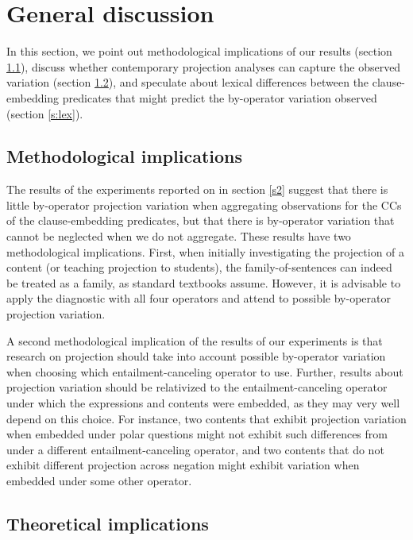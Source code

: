 \documentclass[a4paper,12pt,twoside]{article}
\begin{document}
\section{General discussion}\label{s:general}

    In this section, we point out methodological implications of our results (section \ref{s:method-impl}), discuss whether contemporary projection analyses can capture the observed variation (section \ref{s:analysis}), and speculate about lexical differences between the clause-embedding predicates that might predict the by-operator variation observed (section \ref{s:lex}).

\subsection{Methodological implications}\label{s:method-impl}

    The results of the experiments reported on in section \ref{s2} suggest that there is little by-operator projection variation when aggregating observations for the CCs of the  clause-embedding predicates, but that there is by-operator variation that cannot be neglected when we do not aggregate. These results have two methodological implications. First, when initially investigating the projection of a content (or teaching projection to students), the family-of-sentences can indeed be treated as a family, as standard textbooks assume. However, it is advisable to apply the diagnostic with all four operators and attend to possible by-operator projection variation. 

	A second methodological implication of the results of our experiments is that research on projection should take into account possible by-operator variation when choosing which entail\-ment-canceling operator to use. Further, results about projection variation should be relativized to the entailment-canceling operator under which the expressions and contents were embedded, as they may very well depend on this choice. For instance, two contents that exhibit projection variation when embedded under polar questions might not exhibit such differences from under a different entailment-canceling operator, and two contents that do not exhibit different projection across negation might exhibit variation when embedded under some other operator.

\subsection{Theoretical implications}\label{s:analysis}
\end{document}
